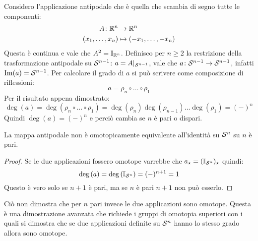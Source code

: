 Considero l'applicazione antipodale che è quella che scambia di segno tutte le componenti:
\begin{align*}
  A \colon \mathbb{R}^{n} & \to \mathbb{R}^{n} \\
  (x_1, \dots, x_{n}) & \mapsto (-x_1, \dots, -x_n)
\end{align*}
Questa è continua e vale che $ A^2 = \mathbb{I}_{\mathbb{R}^{n}}$. Definisco per $ n \geq 2 $ la
restrizione della trasformazione antipodale su $ \mathcal{S}^{n-1} $:
$ a = A \lvert_{\mathcal{S}^{n-1}} $, vale che $ a \colon \mathcal{S}^{n-1} \to \mathcal{S}^{n-1} $, infatti
$ \mathrm{Im}( a ) = \mathcal{S}^{n-1} $. Per calcolare il grado di $ a $ si può scrivere come
composizione di riflessioni:
\[
  a = \rho_n \circ \dots \circ \rho_1
\]
Per il risultato appena dimostrato:
\[
  \deg{(a)} = \deg{(\rho_n \circ \dots \circ \rho_1)} = \deg{(\rho_n)}\deg{(\rho_{n-1})}\dots\deg{(\rho_1)} = (-)^n
\]
Quindi $ \deg{(a)} = (-)^n $ e perciò cambia se $ n $ è pari o dispari.

\begin{corollary}
  La mappa antipodale non è omotopicamente equivalente all'identità su $ \mathcal{S}^{n} $ su $ n $ è pari.
\end{corollary}
\begin{proof}
  Se le due applicazioni fossero omotope varrebbe che $ a_\star = (\mathbb{I}_{\mathcal{S}^{n}})_\star $ quindi:
  \[
    \deg{(a)} = \deg{(\mathbb{I}_{\mathcal{S}^{n}})} = (-)^{n+1} = 1
  \]
  Questo è vero solo se $ n + 1 $ è pari, ma se $ n $ è pari $ n + 1 $ non può esserlo.
\end{proof}
\eproof
Ciò non dimostra che per $ n $ pari invece le due applicazioni sono omotope. Questa è una
dimostrazione avanzata che richiede i gruppi di omotopia superiori con i quali si dimostra
che se due applicazioni definite su $ \mathcal{S}^{n} $ hanno lo stesso grado allora sono omotope.

